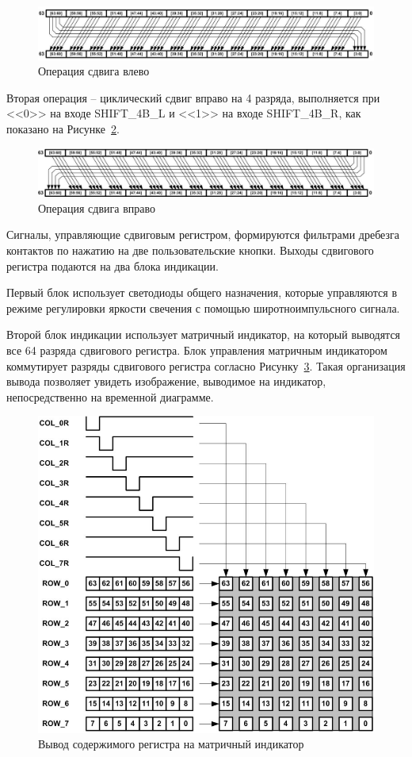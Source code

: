 \begin{figure}[h!]
	\centering
	\includegraphics[width=0.8\linewidth]{course-plis/images/lab4/left_shift}
	\caption{Операция сдвига влево}
	\label{fig:leftshift}
\end{figure}

Вторая операция – циклический сдвиг вправо на 4 разряда, выполняется
при <<0>> на входе SHIFT\_4B\_L и <<1>> на входе SHIFT\_4B\_R, как показано на Рисунке~\ref{fig:rightshift}.


\begin{figure}[h!]
	\centering
	\includegraphics[width=0.8\linewidth]{course-plis/images/lab4/right_shift}
	\caption{Операция сдвига вправо}
	\label{fig:rightshift}
\end{figure}





Сигналы, управляющие сдвиговым регистром, формируются фильтрами
дребезга контактов по нажатию на две пользовательские кнопки.
Выходы сдвигового регистра подаются на два блока индикации.

Первый блок использует светодиоды общего назначения, которые
управляются в режиме регулировки яркости свечения с помощью широтноимпульсного сигнала.

Второй блок индикации использует матричный индикатор, на который
выводятся все 64 разряда сдвигового регистра. Блок управления матричным индикатором коммутирует разряды сдвигового регистра согласно Рисунку~\ref{fig:display-out}.
Такая организация вывода позволяет увидеть изображение, выводимое на
индикатор, непосредственно на временной диаграмме.


\begin{figure}[h!]
	\centering
	\includegraphics[width=0.45\linewidth]{course-plis/images/lab4/display-out}
	\caption{Вывод содержимого регистра на матричный индикатор}
	\label{fig:display-out}
\end{figure}


